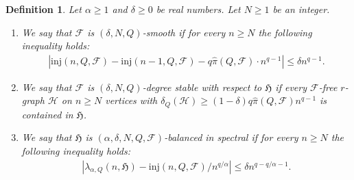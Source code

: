 \documentclass[11pt,a4paper]{article}
\newtheorem{definition}{Definition} [section]
\begin{document}
\begin{definition}\label{DEF:generalized-spectral}
    Let $\alpha \ge 1$ and $\delta \ge 0$ be real numbers. Let $N \ge 1$ be an integer. 
    \begin{enumerate}[label=(\roman*)]
        \item\label{DEF:Q-smoothness} We say that $\mathcal{F}$ is $(\delta, N, Q)$-smooth if for every $n \ge N$ the following inequality holds: 
        \begin{align}\label{equ:Turan-smoothness}
            \left|\mathrm{inj}(n, Q, \mathcal{F}) - \mathrm{inj}(n-1, Q, \mathcal{F}) - q \hat{\pi}(Q, \mathcal{F}) \cdot n^{q-1}\right|
            \le \delta n^{q-1}. 
        \end{align}
        \item\label{DEF:Q-degree-stable} We say that $\mathcal{F}$ is $(\delta, N, Q)$-degree stable with respect to $\mathfrak{H}$ if every $\mathcal{F}$-free $r$-graph $\mathcal{H}$ on $n \ge N$ vertices with $\delta_{Q}(\mathcal{H}) \ge (1-\delta) q \hat{\pi}(Q, \mathcal{F}) n^{q-1}$ is contained in $\mathfrak{H}$.
        \item\label{DEF:spectral-balanced} We say that $\mathfrak{H}$ is $(\alpha, \delta, N, Q, \mathcal{F})$-balanced in spectral if for every $n \ge N$ the following inequality holds: 
        \begin{align}\label{equ:def-spectral-balance}
            \left| \lambda_{\alpha, Q}(n, \mathfrak{H}) - {\mathrm{inj}(n,Q,\mathcal{F})}/{n^{q/\alpha}}\right|
            \le \delta n^{q - q/\alpha - 1}.
        \end{align}
    \end{enumerate}
\end{definition}
\end{document}
